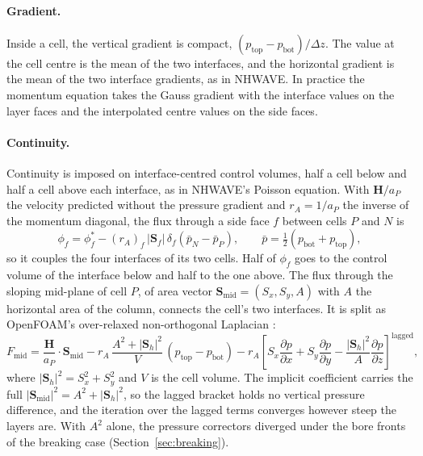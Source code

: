 \paragraph{Gradient.} Inside a cell, the vertical gradient is compact,
$(p_{\mathrm{top}}-p_{\mathrm{bot}})/\Delta z$. The value at the cell centre is
the mean of the two interfaces, and the horizontal gradient is the mean of the
two interface gradients, as in NHWAVE. In practice the momentum equation takes
the Gauss gradient with the interface values on the layer faces and the
interpolated centre values on the side faces.

\paragraph{Continuity.} Continuity is imposed on interface-centred control
volumes, half a cell below and half a cell above each interface, as in
NHWAVE's Poisson equation. With $\bm{H}/a_P$ the velocity predicted without the
pressure gradient and $r_A = 1/a_P$ the inverse of the momentum diagonal, the
flux through a side face $f$ between cells $P$ and $N$ is
\begin{equation}
  \phi_f = \phi^{*}_f - (r_A)_f\,|\bm{S}_f|\,\delta_f\left(\bar p_N - \bar p_P\right),
  \qquad \bar p = \tfrac12\left(p_{\mathrm{bot}} + p_{\mathrm{top}}\right),
  \label{eq:sideflux}
\end{equation}
so it couples the four interfaces of its two cells. Half of $\phi_f$ goes to
the control volume of the interface below and half to the one above. The flux
through the sloping mid-plane of cell $P$, of area vector
$\bm{S}_{\mathrm{mid}} = (S_x,S_y,A)$ with $A$ the horizontal area of the
column, connects the cell's two interfaces. It is split as OpenFOAM's
over-relaxed non-orthogonal Laplacian \citep{jasak1996}:
\begin{equation}
  F_{\mathrm{mid}} = \frac{\bm{H}}{a_P}\cdot\bm{S}_{\mathrm{mid}}
  - r_A\,\frac{A^2 + |\bm{S}_h|^2}{V}\,(p_{\mathrm{top}} - p_{\mathrm{bot}})
  - r_A\left[S_x\frac{\partial p}{\partial x} + S_y\frac{\partial p}{\partial y}
  - \frac{|\bm{S}_h|^2}{A}\frac{\partial p}{\partial z}\right]^{\mathrm{lagged}},
  \label{eq:midflux}
\end{equation}
where $|\bm{S}_h|^2 = S_x^2+S_y^2$ and $V$ is the cell volume. The implicit
coefficient carries the full $|\bm{S}_{\mathrm{mid}}|^2 = A^2 + |\bm{S}_h|^2$,
so the lagged bracket holds no vertical pressure difference, and the iteration
over the lagged terms converges however steep the layers are. With $A^2$ alone,
the pressure correctors diverged under the bore fronts of the breaking case
(Section~\ref{sec:breaking}).

